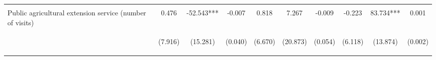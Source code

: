 \begin{center}
\begin{tabular}{lccccccccc}
\vspace{4pt} & \begin{footnotesize}[0.689]\end{footnotesize} & \begin{footnotesize}[0.423]\end{footnotesize} & \begin{footnotesize}[0.411]\end{footnotesize} & \begin{footnotesize}[0.873]\end{footnotesize} & \begin{footnotesize}[0.663]\end{footnotesize} & \begin{footnotesize}[0.000]\end{footnotesize} & \begin{footnotesize}[0.811]\end{footnotesize} & \begin{footnotesize}[0.000]\end{footnotesize} & \begin{footnotesize}[0.472]\end{footnotesize} \\
Public agricultural extension service (number of visits) & 0.476 & -52.543*** & -0.007 & 0.818 & 7.267 & -0.009 & -0.223 & 83.734*** & 0.001 \\
 & \begin{footnotesize}(7.916)\end{footnotesize} & \begin{footnotesize}(15.281)\end{footnotesize} & \begin{footnotesize}(0.040)\end{footnotesize} & \begin{footnotesize}(6.670)\end{footnotesize} & \begin{footnotesize}(20.873)\end{footnotesize} & \begin{footnotesize}(0.054)\end{footnotesize} & \begin{footnotesize}(6.118)\end{footnotesize} & \begin{footnotesize}(13.874)\end{footnotesize} & \begin{footnotesize}(0.002)\end{footnotesize} \\

\end{tabular}
\end{center}
